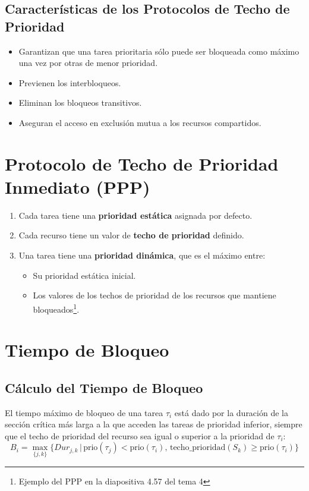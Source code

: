 \documentclass[a4paper,12pt]{article}
\begin{document}
\subsection{Características de los Protocolos de Techo de Prioridad}
\begin{itemize}
    \item Garantizan que una tarea prioritaria sólo puede ser bloqueada como máximo una vez por otras de menor prioridad.
    \item Previenen los interbloqueos.
    \item Eliminan los bloqueos transitivos.
    \item Aseguran el acceso en exclusión mutua a los recursos compartidos.
\end{itemize}

\section{Protocolo de Techo de Prioridad Inmediato (PPP)}

\begin{enumerate}
    \item Cada tarea tiene una \textbf{prioridad estática} asignada por defecto.
    \item Cada recurso tiene un valor de \textbf{techo de prioridad} definido.
    \item Una tarea tiene una \textbf{prioridad dinámica}, que es el máximo entre:
    \begin{itemize}
        \item Su prioridad estática inicial.
        \item Los valores de los techos de prioridad de los recursos que mantiene bloqueados\footnote{Ejemplo del PPP en la diapositiva 4.57 del tema 4}.
    \end{itemize}
\end{enumerate}

\section{Tiempo de Bloqueo}

\subsection{Cálculo del Tiempo de Bloqueo}
El tiempo máximo de bloqueo de una tarea \(\tau_i\) está dado por la duración de la sección crítica más larga a la que acceden las tareas de prioridad inferior, siempre que el techo de prioridad del recurso sea igual o superior a la prioridad de \(\tau_i\):
\[
B_i = \max_{\{j,k\}} \{Dur_{j,k} \, | \, \text{prio}(\tau_j) < \text{prio}(\tau_i), \, \text{techo\_prioridad}(S_k) \geq \text{prio}(\tau_i)\}
\]
\end{document}

